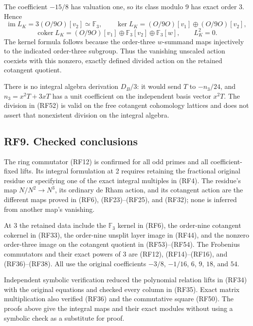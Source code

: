 \documentclass[
  10pt,
]{article}
\begin{document}
The coefficient \(-15/8\) has valuation one, so its class modulo 9 has
exact order 3. Hence \[
\operatorname{im}L_K=3(O/9O)[v_2]\simeq\mathbb F_3,\qquad
\ker L_K=(O/9O)[v_1]\oplus(O/9O)[v_2],
\] \[
\operatorname{coker}L_K
=(O/9O)[v_1]\oplus\mathbb F_3[v_2]\oplus\mathbb F_3[w],
\qquad L_K^2=0.
\tag{RF54}
\] The kernel formula follows because the order-three \(w\)-summand maps
injectively to the indicated order-three subgroup. Thus the vanishing
unscaled action coexists with this nonzero, exactly defined divided
action on the retained cotangent quotient.

There is no integral algebra derivation \(D_B/3\): it would send \(T\)
to \(-n_3/24\), and \(n_3=x^2T+3xT\) has a unit coefficient on the
independent basis vector \(x^2T\). The division in (RF52) is valid on
the free cotangent cohomology lattices and does not assert that
nonexistent division on the integral algebra.

\subsection{RF9. Checked conclusions}\label{rf9.-checked-conclusions}

The ring commutator (RF12) is confirmed for all odd primes and all
coefficient-fixed lifts. Its integral formulation at 2 requires
retaining the fractional original residue or specifying one of the exact
integral multiples in (RF4). The residue's map \(N/N^2\to N^3\), its
ordinary de Rham action, and its cotangent action are the different maps
proved in (RF6), (RF23)--(RF25), and (RF32); none is inferred from
another map's vanishing.

At 3 the retained data include the \(\mathbb F_3\) kernel in (RF6), the
order-nine cotangent cokernel in (RF33), the order-nine unsplit layer
image in (RF44), and the nonzero order-three image on the cotangent
quotient in (RF53)--(RF54). The Frobenius commutators and their exact
powers of 3 are (RF12), (RF14)--(RF16), and (RF36)--(RF38). All use the
original coefficients \(-3/8\), \(-1/16\), \(6\), \(9\), \(18\), and
\(54\).

Independent symbolic verification reduced the polynomial relation lifts
in (RF34) with the original equations and checked every column in
(RF35). Exact matrix multiplication also verified (RF36) and the
commutative square (RF50). The proofs above give the integral maps and
their exact modules without using a symbolic check as a substitute for
proof.
\end{document}
